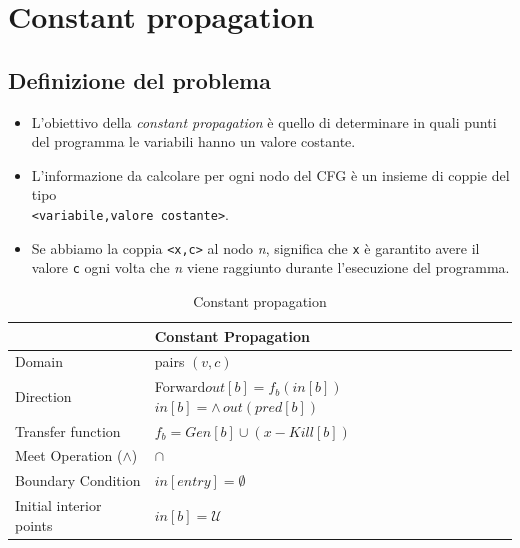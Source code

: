 \documentclass[10pt,a4paper]{article}
\begin{document}
\newpage
\section{Constant propagation}

\subsection{Definizione del problema}

\begin{itemize}
  \item L'obiettivo della \textit{constant propagation} \`e quello di determinare in quali punti del programma le variabili hanno un valore costante.
  \item L'informazione da calcolare per ogni nodo del CFG \`e un insieme di coppie del tipo\\\lstinline|<variabile,valore costante>|.
  \item Se abbiamo la coppia \lstinline|<x,c>| al nodo \textit{n}, significa che \lstinline|x| \`e garantito avere il valore \lstinline|c| ogni volta che \textit{n} viene raggiunto durante l'esecuzione del programma.
\end{itemize}


\begin{table}[h!]
  \centering
  \begin{tabular}{|l|p{4cm}|}
    \hline
    \textbf{} & \textbf{Constant Propagation} \\
    \hline
    Domain & pairs $(v,c)$\\
    \hline
    Direction & Forward\newline $out[b]=f_{b}(in[b])$ \newline $in[b] = \wedge\, out(pred[b])$ \\
    \hline
    Transfer function & $f_{b}=Gen[b] \cup (x - Kill[b])$ \\
    \hline
    Meet Operation (\(\land\)) & $\cap$\\
    \hline
    Boundary Condition & $in[entry]=\emptyset$ \\
    \hline
    Initial interior points & $in[b]=\mathcal{U}$ \\
    \hline
  \end{tabular}
  \caption{Constant propagation}
\end{table}
\end{document}
